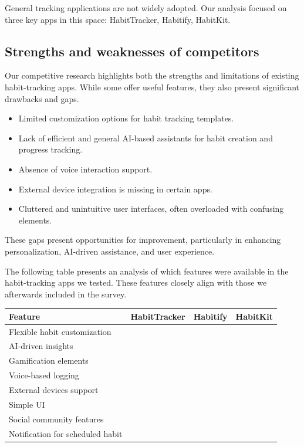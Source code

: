 \documentclass{article}
\newcommand{\vmark}{\textcolor{teal}{\ding{51}}}
\newcommand{\xmark}{\textcolor{red!70!black}{\ding{55}}}
\begin{document}
General tracking applications are not widely adopted.
Our analysis focused on three key apps in this space: HabitTracker, Habitify, HabitKit.

\subsection{Strengths and weaknesses of competitors}

Our competitive research highlights both the strengths and limitations of existing habit-tracking apps.
While some offer useful features, they also present significant drawbacks and gaps.

\begin{itemize}
	\item Limited customization options for habit tracking templates.
	\item Lack of efficient and general AI-based assistants for habit creation and progress tracking.
	\item Absence of voice interaction support.
	\item External device integration is missing in certain apps.
	\item Cluttered and unintuitive user interfaces, often overloaded with confusing elements.
\end{itemize}

These gaps present opportunities for improvement, particularly in enhancing personalization, AI-driven assistance, and user experience.

The following table presents an analysis of which features were available in the habit-tracking apps we tested.
These features closely align with those we afterwards included in the survey.

\begin{table}[H]
	\centering
	\begin{tabular}{l|c|c|c}
		\hline
		\textbf{Feature}                 & \textbf{HabitTracker} & \textbf{Habitify} & \textbf{HabitKit} \\
		\hline
		Flexible habit customization     & \vmark \xmark         & \vmark \xmark     & \vmark \xmark     \\
		AI-driven insights               & \xmark                & \xmark            & \xmark            \\
		Gamification elements            & \vmark                & \xmark            & \vmark            \\
		Voice-based logging              & \xmark                & \xmark            & \xmark            \\
		External devices support         & \xmark                & \vmark            & \xmark            \\
		Simple UI                        & \vmark                & \vmark            & \vmark            \\
		Social community features        & \vmark                & \xmark            & \xmark            \\
		Notification for scheduled habit & \vmark                & \vmark            & \vmark            \\
		\hline
	\end{tabular}
\end{table}
\end{document}

